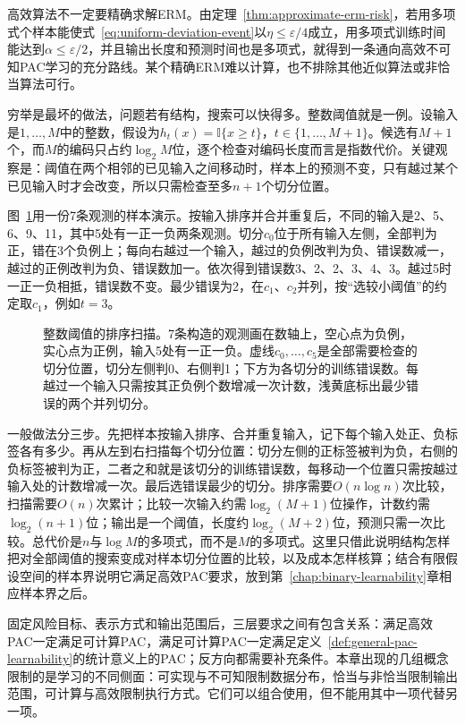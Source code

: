 高效算法不一定要精确求解ERM。由定理~\ref{thm:approximate-erm-risk}，若用多项式个样本能使式~\eqref{eq:uniform-deviation-event}以$\eta\leq\varepsilon/4$成立，用多项式训练时间能达到$\alpha\leq\varepsilon/2$，并且输出长度和预测时间也是多项式，就得到一条通向高效不可知PAC学习的充分路线。某个精确ERM难以计算，也不排除其他近似算法或非恰当算法可行。

穷举是最坏的做法，问题若有结构，搜索可以快得多。整数阈值就是一例。设输入是$1,\ldots,M$中的整数，假设为$h_t(x)=\mathbb I\{x\geq t\}$，$t\in\{1,\ldots,M+1\}$。候选有$M+1$个，而$M$的编码只占约$\log_2M$位，逐个检查对编码长度而言是指数代价。关键观察是：阈值在两个相邻的已见输入之间移动时，样本上的预测不变，只有越过某个已见输入时才会改变，所以只需检查至多$n+1$个切分位置。

图~\ref{fig:lt4-integer-threshold-scan}用一份7条观测的样本演示。按输入排序并合并重复后，不同的输入是2、5、6、9、11，其中5处有一正一负两条观测。切分$c_0$位于所有输入左侧，全部判为正，错在3个负例上；每向右越过一个输入，越过的负例改判为负、错误数减一，越过的正例改判为负、错误数加一。依次得到错误数3、2、2、3、4、3。越过5时一正一负相抵，错误数不变。最少错误为2，在$c_1$、$c_2$并列，按“选较小阈值”的约定取$c_1$，例如$t=3$。

\begin{figure}[htbp]
 \centering
 
 \caption{整数阈值的排序扫描。7条构造的观测画在数轴上，空心点为负例，实心点为正例，输入5处有一正一负。虚线$c_0,\ldots,c_5$是全部需要检查的切分位置，切分左侧判0、右侧判1；下方为各切分的训练错误数。每越过一个输入只需按其正负例个数增减一次计数，浅黄底标出最少错误的两个并列切分。}
 \label{fig:lt4-integer-threshold-scan}
\end{figure}

一般做法分三步。先把样本按输入排序、合并重复输入，记下每个输入处正、负标签各有多少。再从左到右扫描每个切分位置：切分左侧的正标签被判为负，右侧的负标签被判为正，二者之和就是该切分的训练错误数，每移动一个位置只需按越过输入处的计数增减一次。最后选错误最少的切分。排序需要$O(n\log n)$次比较，扫描需要$O(n)$次累计；比较一次输入约需$\log_2(M+1)$位操作，计数约需$\log_2(n+1)$位；输出是一个阈值，长度约$\log_2(M+2)$位，预测只需一次比较。总代价是$n$与$\log M$的多项式，而不是$M$的多项式。这里只借此说明结构怎样把对全部阈值的搜索变成对样本切分位置的比较，以及成本怎样核算；结合有限假设空间的样本界说明它满足高效PAC要求，放到第~\ref{chap:binary-learnability}章相应样本界之后。

固定风险目标、表示方式和输出范围后，三层要求之间有包含关系：满足高效PAC一定满足可计算PAC，满足可计算PAC一定满足定义~\ref{def:general-pac-learnability}的统计意义上的PAC；反方向都需要补充条件。本章出现的几组概念限制的是学习的不同侧面：可实现与不可知限制数据分布，恰当与非恰当限制输出范围，可计算与高效限制执行方式。它们可以组合使用，但不能用其中一项代替另一项。

